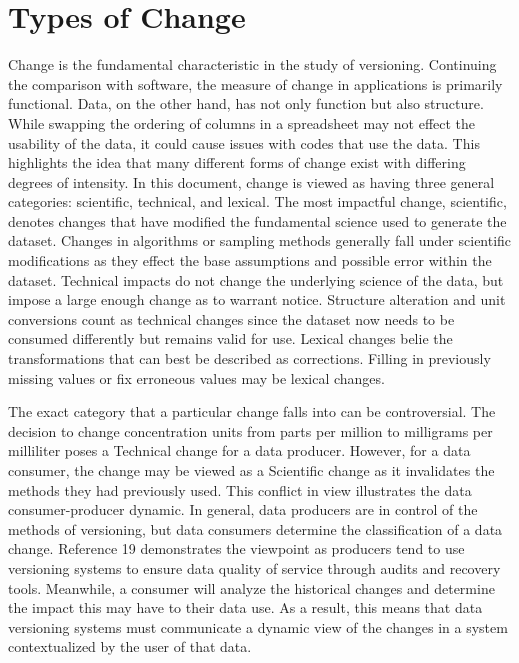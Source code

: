 \section{Types of Change}

Change is the fundamental characteristic in the study of versioning.
Continuing the comparison with software, the measure of change in applications is primarily functional.
Data, on the other hand, has not only function but also structure.
While swapping the ordering of columns in a spreadsheet may not effect the usability of the data, it could cause issues with codes that use the data.
This highlights the idea that many different forms of change exist with differing degrees of intensity.
In this document, change is viewed as having three general categories: scientific, technical, and lexical.
The most impactful change, scientific, denotes changes that have modified the fundamental science used to generate the dataset.
Changes in algorithms or sampling methods generally fall under scientific modifications as they effect the base assumptions and possible error within the dataset.
Technical impacts do not change the underlying science of the data, but impose a large enough change as to warrant notice.
Structure alteration and unit conversions count as technical changes since the dataset now needs to be consumed differently but remains valid for use.
Lexical changes belie the transformations that can best be described as corrections.
Filling in previously missing values or fix erroneous values may be lexical changes.

The exact category that a particular change falls into can be controversial.
The decision to change concentration units from parts per million to milligrams per milliliter poses a Technical change for a data producer.
However, for a data consumer, the change may be viewed as a Scientific change as it invalidates the methods they had previously used.
This conflict in view illustrates the data consumer-producer dynamic.
In general, data producers are in control of the methods of versioning, but data consumers determine the classification of a data change.
Reference 19 demonstrates the viewpoint as producers tend to use versioning systems to ensure data quality of service through audits and recovery tools.
Meanwhile, a consumer will analyze the historical changes and determine the impact this may have to their data use.
As a result, this means that data versioning systems must communicate a dynamic view of the changes in a system contextualized by the user of that data.

